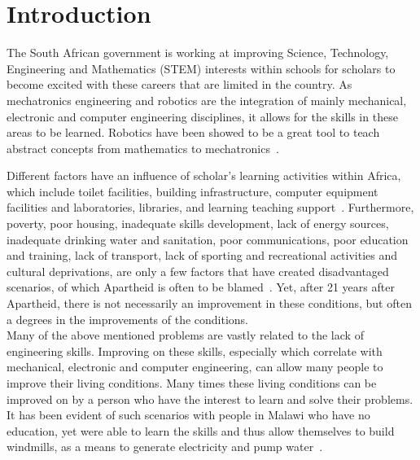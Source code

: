 \documentclass{intech-journal}
\begin{document}
\maketitle

\articleabstract{
}

\section{Introduction}
The South African government is working at improving Science, Technology, Engineering and Mathematics (STEM) interests within schools for scholars to become excited with these careers that are limited in the country. 
As mechatronics engineering and robotics are the integration of mainly mechanical, electronic and computer engineering disciplines, it allows for the skills in these areas to be learned. 
Robotics have been showed to be a great tool to teach abstract concepts from mathematics to mechatronics~\cite{benitti2012exploring}.



Different factors have an influence of scholar's learning activities within Africa, which include toilet facilities, building infrastructure, computer equipment facilities and laboratories,  libraries, and learning teaching support~\cite{sedibe2011inequality}. 
Furthermore, poverty, poor housing, inadequate skills development, lack of energy sources, inadequate drinking water and sanitation, poor communications, poor education and training, lack of transport, lack of sporting and recreational activities and cultural deprivations, are only a few factors that have created disadvantaged scenarios, of which Apartheid is often to be blamed~\cite{mokoena2009improving}. 
Yet, after 21 years after Apartheid, there is not necessarily an improvement in these conditions, but often a degrees in the improvements of the conditions.
\\
\hspace{1cm}Many of the above mentioned problems are vastly related to the lack of engineering skills. 
Improving on these skills, especially which correlate with mechanical, electronic and computer engineering, can allow many people to improve their living conditions. 
Many times these living conditions can be improved on by a person who have the interest to learn and solve their problems. 
It has been evident of such scenarios with people in Malawi who have no education, yet were able to learn the skills and thus allow themselves to build windmills, as a means to generate electricity and pump water~\cite{Sheerin2009}.
\end{document}
